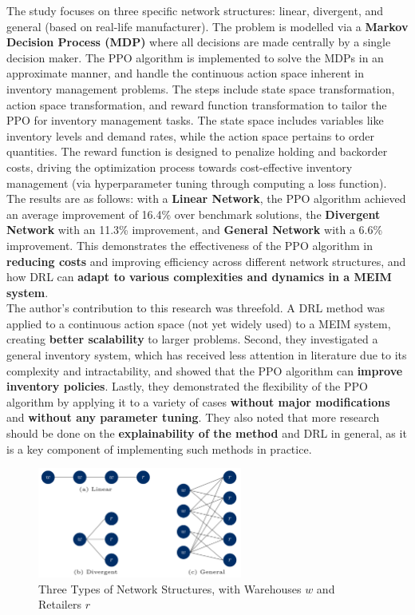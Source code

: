 \documentclass[12pt]{article}
\begin{document}
\noindent The study focuses on three specific network structures: linear, divergent, and general (based on real-life manufacturer). The problem is modelled via a \textbf{Markov Decision Process (MDP)} where all decisions are made centrally by a single decision maker. The PPO algorithm is implemented to solve the MDPs in an approximate manner, and handle the continuous action space inherent in inventory management problems. The steps include state space transformation, action space transformation, and reward function transformation to tailor the PPO for inventory management tasks. The state space includes variables like inventory levels and demand rates, while the action space pertains to order quantities. The reward function is designed to penalize holding and backorder costs, driving the optimization process towards cost-effective inventory management (via hyperparameter tuning through computing a loss function). The results are as follows: with a \textbf{Linear Network}, the PPO algorithm achieved an average improvement of 16.4\% over benchmark solutions, the \textbf{Divergent Network} with an 11.3\% improvement, and \textbf{General Network} with a 6.6\% improvement. This demonstrates the effectiveness of the PPO algorithm in \textbf{reducing costs} and improving efficiency across different network structures, and how DRL can \textbf{adapt to various complexities and dynamics in a MEIM system}. \\ 

\noindent The author's contribution to this research was threefold. A DRL method was applied to a continuous action space (not yet widely used) to a MEIM system, creating \textbf{better scalability} to larger problems. Second, they investigated a general inventory system, which has received less attention in literature due to its complexity and intractability, and showed that the PPO algorithm can \textbf{improve inventory policies}. Lastly, they demonstrated the flexibility of the PPO algorithm by applying it to a variety of cases \textbf{without major modifications} and \textbf{without any parameter tuning}. They also noted that more research should be done on the \textbf{explainability of the method} and DRL in general, as it is a key component of implementing such methods in practice. 

\begin{figure}[H]
    \centering
    \includegraphics[width=0.6\textwidth]{Images/threenetworks.png}
    \caption{Three Types of Network Structures, with Warehouses $w$ and Retailers $r$}
    \label{fig:5-threenetwork}
\end{figure} 
\end{document}
